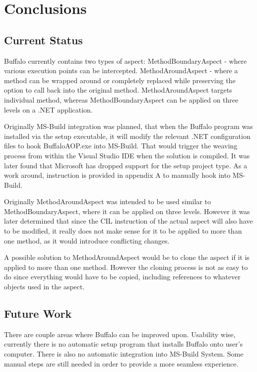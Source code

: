 \chapter{Conclusions}
\section{Current Status}

Buffalo currently contains two types of aspect:  MethodBoundaryAspect - where various execution points can be intercepted. MethodAroundAspect - where a method can be wrapped around or completely replaced while preserving the option to call back into the original method. MethodAroundAspect targets individual method, whereas MethodBoundaryAspect can be applied on three levels on a .NET application.

Originally MS-Build integration was planned, that when the Buffalo program was installed via the setup executable, it will modify the relevant .NET configuration files to hook BuffaloAOP.exe into MS-Build. That would trigger the weaving process from within the Visual Studio IDE when the solution is compiled. It was later found that Microsoft has dropped support for the setup project type. As a work around, instruction is provided in appendix A to manually hook into MS-Build.

Originally MethodAroundAspect was intended to be used similar to MethodBoundaryAspect, where it can be applied on three levels. However it was later determined that since the CIL instruction of the actual aspect will also have to be modified, it really does not make sense for it to be applied to more than one method, as it would introduce conflicting changes.

A possible solution to MethodAroundAspect would be to clone the aspect if it is applied to more than one method. However the cloning process is not as easy to do since everything would have to be copied, including references to whatever objects used in the aspect.

\section{Future Work}

There are couple areas where Buffalo can be improved upon. Usability wise, currently there is no automatic setup program that installs Buffalo onto user’s computer. There is also no automatic integration into MS-Build System. Some manual steps are still needed in order to provide a more seamless experience.

